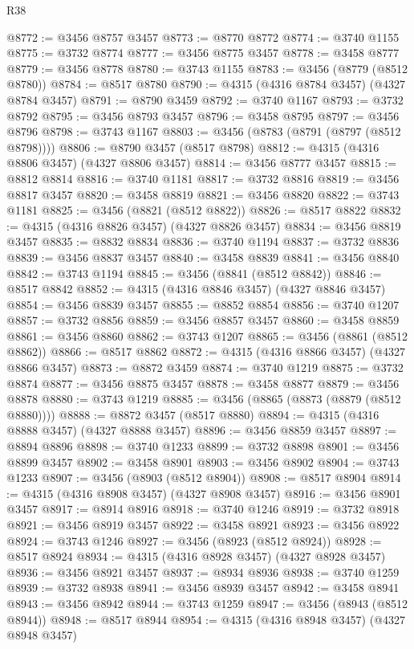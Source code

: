 \begin{lexlean}{R38}
\begin{coremodule}
@8772 := @3456 @8757 @3457
@8773 := @8770 @8772
@8774 := @3740 @1155
@8775 := @3732 @8774
@8777 := @3456 @8775 @3457
@8778 := @3458 @8777
@8779 := @3456 @8778
@8780 := @3743 @1155
@8783 := @3456 (@8779 (@8512 @8780))
@8784 := @8517 @8780
@8790 := @4315 (@4316 @8784 @3457) (@4327 @8784 @3457)
@8791 := @8790 @3459
@8792 := @3740 @1167
@8793 := @3732 @8792
@8795 := @3456 @8793 @3457
@8796 := @3458 @8795
@8797 := @3456 @8796
@8798 := @3743 @1167
@8803 := @3456 (@8783 (@8791 (@8797 (@8512 @8798))))
@8806 := @8790 @3457 (@8517 @8798)
@8812 := @4315 (@4316 @8806 @3457) (@4327 @8806 @3457)
@8814 := @3456 @8777 @3457
@8815 := @8812 @8814
@8816 := @3740 @1181
@8817 := @3732 @8816
@8819 := @3456 @8817 @3457
@8820 := @3458 @8819
@8821 := @3456 @8820
@8822 := @3743 @1181
@8825 := @3456 (@8821 (@8512 @8822))
@8826 := @8517 @8822
@8832 := @4315 (@4316 @8826 @3457) (@4327 @8826 @3457)
@8834 := @3456 @8819 @3457
@8835 := @8832 @8834
@8836 := @3740 @1194
@8837 := @3732 @8836
@8839 := @3456 @8837 @3457
@8840 := @3458 @8839
@8841 := @3456 @8840
@8842 := @3743 @1194
@8845 := @3456 (@8841 (@8512 @8842))
@8846 := @8517 @8842
@8852 := @4315 (@4316 @8846 @3457) (@4327 @8846 @3457)
@8854 := @3456 @8839 @3457
@8855 := @8852 @8854
@8856 := @3740 @1207
@8857 := @3732 @8856
@8859 := @3456 @8857 @3457
@8860 := @3458 @8859
@8861 := @3456 @8860
@8862 := @3743 @1207
@8865 := @3456 (@8861 (@8512 @8862))
@8866 := @8517 @8862
@8872 := @4315 (@4316 @8866 @3457) (@4327 @8866 @3457)
@8873 := @8872 @3459
@8874 := @3740 @1219
@8875 := @3732 @8874
@8877 := @3456 @8875 @3457
@8878 := @3458 @8877
@8879 := @3456 @8878
@8880 := @3743 @1219
@8885 := @3456 (@8865 (@8873 (@8879 (@8512 @8880))))
@8888 := @8872 @3457 (@8517 @8880)
@8894 := @4315 (@4316 @8888 @3457) (@4327 @8888 @3457)
@8896 := @3456 @8859 @3457
@8897 := @8894 @8896
@8898 := @3740 @1233
@8899 := @3732 @8898
@8901 := @3456 @8899 @3457
@8902 := @3458 @8901
@8903 := @3456 @8902
@8904 := @3743 @1233
@8907 := @3456 (@8903 (@8512 @8904))
@8908 := @8517 @8904
@8914 := @4315 (@4316 @8908 @3457) (@4327 @8908 @3457)
@8916 := @3456 @8901 @3457
@8917 := @8914 @8916
@8918 := @3740 @1246
@8919 := @3732 @8918
@8921 := @3456 @8919 @3457
@8922 := @3458 @8921
@8923 := @3456 @8922
@8924 := @3743 @1246
@8927 := @3456 (@8923 (@8512 @8924))
@8928 := @8517 @8924
@8934 := @4315 (@4316 @8928 @3457) (@4327 @8928 @3457)
@8936 := @3456 @8921 @3457
@8937 := @8934 @8936
@8938 := @3740 @1259
@8939 := @3732 @8938
@8941 := @3456 @8939 @3457
@8942 := @3458 @8941
@8943 := @3456 @8942
@8944 := @3743 @1259
@8947 := @3456 (@8943 (@8512 @8944))
@8948 := @8517 @8944
@8954 := @4315 (@4316 @8948 @3457) (@4327 @8948 @3457)

\end{coremodule}
\end{lexlean}
